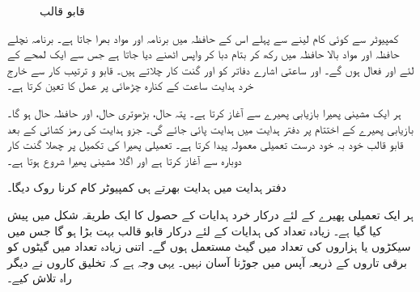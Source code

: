 \begin{figure}
\caption{قابو قالب}
\label{شکل_کمپیوٹر_قابو_دور}
\end{figure}

کمپیوٹر سے کوئی کام لینے سے پہلے اس کے حافظہ میں  برنامہ  اور مواد بھرا جاتا ہے۔ برنامہ نچلے حافظہ اور مواد بالا حافظہ میں رکھ کر   بتام  دبا کر واپس  اٹھنے دیا جاتا ہے جس سے ایک لمحے کے لئے   اور  فعال ہوں گے۔  اور  ساعتی اشارے دفاتر کو  اور گنت کار چلاتے ہیں۔ قابو و ترتیب کار سے خارج  خرد ہدایت  ساعت کے کنارہ چڑھائی پر   عمل کا تعین کرتا ہے۔

ہر ایک  مشینی  پھیرا  بازیابی پھیرے سے آغاز کرتا ہے۔  پتہ حال،  بڑھوتری حال، اور  حافظہ حال ہو گا۔ بازیابی پھیرے کے اختتام پر  دفتر ہدایت میں ہدایت پائی جائے گی۔  جزو ہدایت   کی رمز کشائی کے بعد  قابو قالب خود بہ خود   درست تعمیلی معمولہ پیدا کرتا ہے۔ تعمیلی پھیرا  کی تکمیل   پر چھلا گنت کار دوبارہ  سے آغاز کرتا ہے اور اگلا مشینی پھیرا شروع ہوتا ہے۔

دفتر ہدایت میں   ہدایت    بھرتے ہی  کمپیوٹر کام    کرنا  روک دیگا۔

ہر ایک تعمیلی پھیرے کے لئے درکار خرد ہدایات  کے حصول کا ایک طریقہ شکل  میں پیش کیا گیا ہے۔ زیادہ تعداد کی  ہدایات  کے لئے درکار قابو قالب بہت بڑا ہو گا جس میں سیکڑوں یا ہزاروں کی تعداد میں گیٹ مستعمل ہوں گے۔ اتنی زیادہ تعداد میں گیٹوں کو برقی تاروں کے ذریعہ آپس میں جوڑنا آسان نہیں۔ یہی وجہ ہے کہ تخلیق کاروں نے دیگر راہ تلاش کیے۔

